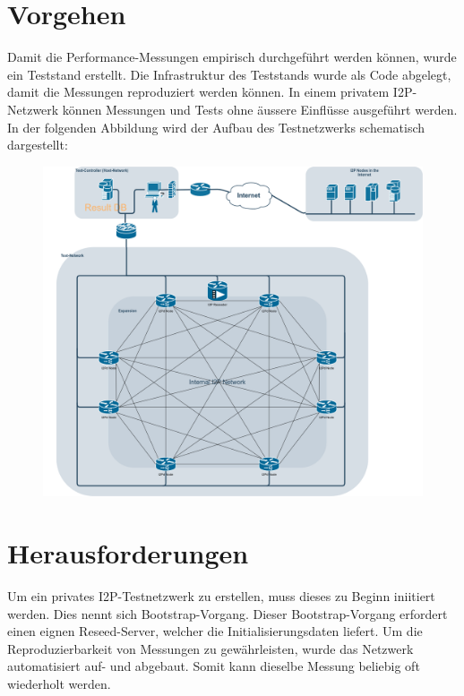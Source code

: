 \documentclass[
	a4paper,10pt
]{scrartcl}
\begin{document}
\section{Vorgehen}

Damit die Performance-Messungen empirisch durchgeführt werden können, wurde ein Teststand erstellt.
Die Infrastruktur des Teststands wurde als Code abgelegt, damit die Messungen reproduziert werden können.
In einem privatem I2P-Netzwerk können Messungen und Tests ohne äussere Einflüsse ausgeführt werden.
In der folgenden Abbildung wird der Aufbau des Testnetzwerks schematisch dargestellt:


\begin{figure}[H]
  \includegraphics[width=1.0\textwidth]{i2p-testnetwork.png}
\end{figure}


\section{Herausforderungen}

Um ein privates I2P-Testnetzwerk zu erstellen, muss dieses zu Beginn iniitiert werden. Dies nennt sich Bootstrap-Vorgang. Dieser Bootstrap-Vorgang erfordert einen eignen Reseed-Server, welcher die Initialisierungsdaten liefert.
Um die Reproduzierbarkeit von Messungen zu gewährleisten, wurde das Netzwerk automatisiert auf- und abgebaut.
Somit kann dieselbe Messung beliebig oft wiederholt werden.
\end{document}
